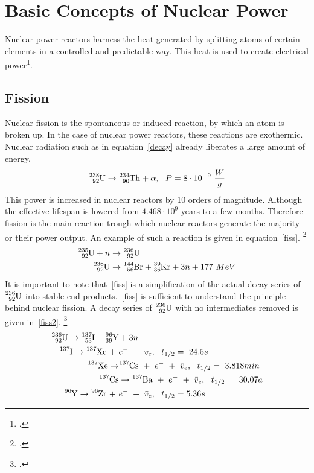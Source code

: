 \chapter{Basic Concepts of Nuclear Power}
Nuclear power reactors harness the heat generated by splitting atoms of certain
elements in a controlled and predictable way. This heat is used to create electrical power\footcite{WNPR}.
\section{Fission}
Nuclear fission is the spontaneous or induced reaction, by which an atom is broken up. In the
case of nuclear power reactors, these reactions are exothermic. Nuclear radiation such as in equation~\ref{decay}
already liberates a large amount of energy.
\begin{equation} \label{decay}
    \ce{^{238}_{92}U} \rightarrow \ce{^{234}_{90}Th} + \alpha, ~~P = 8 \cdot 10^{-9} ~\frac{W}{g}
\end{equation}
This power is increased in nuclear reactors by 10 orders of magnitude. Although the effective lifespan
is lowered from $4.468 \cdot 10^{9}$ years to a few months. Therefore fission is the main reaction
trough which nuclear reactors generate the majority or their power output. An example of such
a reaction is given in equation~\ref{fiss}. \footcite[286]{nucfundamentals}
\begin{equation} \label{fiss}
\begin{split}
    \ce{^{235}_{92}U} + n & \rightarrow \ce{^{236}_{92}U} \\
    \ce{^{236}_{92}U} & \rightarrow \ce{^{144}_{56}Br} + \ce{^{39}_{36}Kr} + 3n + 177 ~MeV
\end{split}
\end{equation}
It is important to note that~\ref{fiss} is a simplification of the actual decay series of $\ce{^{236}_{92}U}$ into
stable end products.~\ref{fiss} is sufficient to understand the principle behind nuclear fission.
A decay series of $\ce{^{236}_{92}U}$ with no intermediates removed is given in~\ref{fiss2}. \footcite[287]{nucfundamentals}
\begin{equation} \label{fiss2}
    \begin{split}
        \ce{^{236}_{92}U} \rightarrow \ce{^{137}_{53}I} + \ce{^{96}_{39}Y} & + 3n \\
            \ce{^{137}I} \rightarrow \ce{^{137}Xe} ~+~ & e^{-} ~+~ \bar{v}_{e}, ~~t_{1/2}=~24.5s \\
                \ce{^{137}Xe} \rightarrow & \ce{^{137}Cs} ~+~ e^{-} ~+~ \bar{v}_{e}, ~~t_{1/2}=~3.818min \\
                    \ce{^{137}Cs}& \rightarrow \ce{^{137}Ba} ~+~ e^{-} ~+~ \bar{v}_{e}, ~~t_{1/2}=~30.07a \\
            \ce{^{96}Y} \rightarrow \ce{^{96}Zr} ~+~ & e^{-} ~+~ \bar{v}_{e}, ~~t_{1/2}=5.36s 
    \end{split}
\end{equation}

